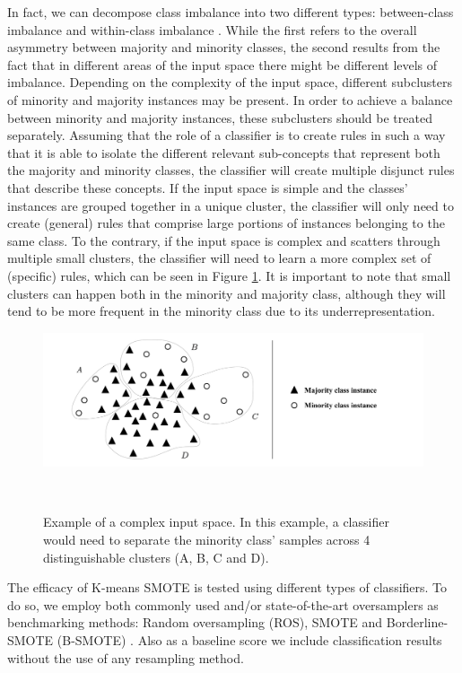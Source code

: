 In fact, we can decompose class imbalance into two different types:
between-class imbalance and within-class imbalance \cite{Douzas2018, Jo2004}.
While the first refers to the overall asymmetry between majority and minority
classes, the second results from the fact that in different areas of the input
space there might be different levels of imbalance. Depending on the
complexity of the input space, different subclusters of minority and majority
instances may be present. In order to achieve a balance between minority and
majority instances, these subclusters should be treated separately. Assuming
that the role of a classifier is to create rules in such a way that it is able
to isolate the different relevant sub-concepts that represent both the
majority and minority classes, the classifier will create multiple disjunct
rules that describe these concepts. If the input space is simple and the
classes’ instances are grouped together in a unique cluster, the classifier
will only need to create (general) rules that comprise large portions of
instances belonging to the same class. To the contrary, if the input space is
complex and scatters through multiple small clusters, the classifier will need
to learn a more complex set of (specific) rules, which can be seen in Figure
\ref{fig:complex_input_space_example}. It is important to note that small
clusters can happen both in the minority and majority class, although they
will tend to be more frequent in the minority class due to its
underrepresentation.  

\begin{figure}[ht]
	\includegraphics[width=1\linewidth]{complex_input_space_example}
    \caption[Example of a complex input space.]{%
        Example of a complex input space. In this example, a classifier
        would need to separate the minority class' samples across 4
        distinguishable clusters (A, B, C and D).
    }~\label{fig:complex_input_space_example}
\end{figure}

The efficacy of K-means SMOTE is tested using different types of classifiers.
To do so, we employ both commonly used and/or state-of-the-art oversamplers as
benchmarking methods: Random oversampling (ROS), SMOTE and Borderline-SMOTE
(B-SMOTE) \cite{Han2005}. Also as a baseline score we include classification
results without the use of any resampling method.

